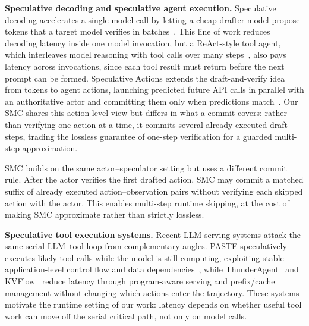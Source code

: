 \textbf{Speculative decoding and speculative agent execution.}
Speculative decoding accelerates a single model call by letting a cheap drafter model propose tokens that a target model verifies in batches~\cite{leviathan-2023-specdec}. 
This line of work reduces decoding latency inside one model invocation, but a ReAct-style tool agent, which interleaves model reasoning with tool calls over many steps~\cite{react-2023}, also pays latency across invocations, since each tool result must return before the next prompt can be formed. 
Speculative Actions extends the draft-and-verify idea from tokens to agent actions, launching predicted future API calls in parallel with an authoritative actor and committing them only when predictions match~\cite{speculative-actions-2026}. 
Our SMC shares this action-level view but differs in what a commit covers: rather than verifying one action at a time, it commits several already executed draft steps, trading the lossless guarantee of one-step verification for a guarded multi-step approximation.

SMC builds on the same actor--speculator setting but uses a different commit rule.
After the actor verifies the first drafted action, SMC may commit a matched suffix of already executed action--observation pairs without verifying each skipped action with the actor.
This enables multi-step runtime skipping, at the cost of making SMC approximate rather than strictly lossless.



\textbf{Speculative tool execution systems.}
Recent LLM-serving systems attack the same serial LLM--tool loop from complementary angles. 
PASTE speculatively executes likely tool calls while the model is still computing, exploiting stable application-level control flow and data dependencies~\citep{paste-2026}, while ThunderAgent~\citep{thunderagent-2026} and KVFlow~\citep{kvflow-2025} reduce latency through program-aware serving and prefix/cache management without changing which actions enter the trajectory. 
These systems motivate the runtime setting of our work: latency depends on whether useful tool work can move off the serial critical path, not only on model calls. 

